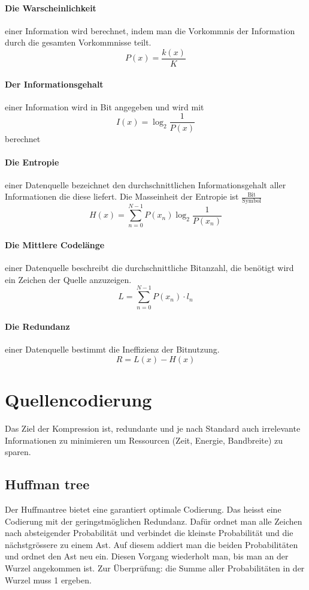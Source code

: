 \documentclass{article}
\begin{document}
\paragraph{Die Warscheinlichkeit} einer Information wird berechnet, indem man die Vorkommnis der Information durch die gesamten Vorkommnisse teilt. \[
		P(x) = \frac{k(x)}{K} 
\]
\paragraph{Der Informationsgehalt} einer Information wird in Bit angegeben und wird mit \[
		I(x)= \log_{2} \frac{1}{P(x)}
\]
berechnet
\paragraph{Die Entropie} einer Datenquelle bezeichnet den durchschnittlichen Informationsgehalt aller Informationen die diese liefert. Die Masseinheit der Entropie ist $ \frac{\textrm{Bit}}{\textrm{Symbol}} $
\[
		H(x) = \sum_{n=0}^{N-1} P(x_n) \log_{2} \frac{1}{P(x_n)}
\]
\paragraph{Die Mittlere Codelänge} einer Datenquelle beschreibt die durchschnittliche Bitanzahl, die benötigt wird ein Zeichen der Quelle anzuzeigen.
\[
		L = \sum_{n=0}^{N-1} P(x_n) \cdot l_n 
\]
\paragraph{Die Redundanz} einer Datenquelle bestimmt die Ineffizienz der Bitnutzung. \[
		R = L(x) - H(x)
\]

\section{Quellencodierung}
Das Ziel der Kompression ist, redundante und je nach Standard auch irrelevante Informationen zu minimieren um Ressourcen (Zeit, Energie, Bandbreite) zu sparen.
\subsection{Huffman tree}
Der Huffmantree bietet eine garantiert optimale Codierung. Das heisst eine Codierung mit der geringstmöglichen Redundanz. Dafür ordnet man alle Zeichen nach absteigender Probabilität und verbindet die kleinste Probabilität und die nächstgrössere zu einem Ast. Auf diesem addiert man die beiden Probabilitäten und ordnet den Ast neu ein. Diesen Vorgang wiederholt man, bis man an der Wurzel angekommen ist. Zur Überprüfung: die Summe aller Probabilitäten in der Wurzel muss 1 ergeben.
\end{document}
